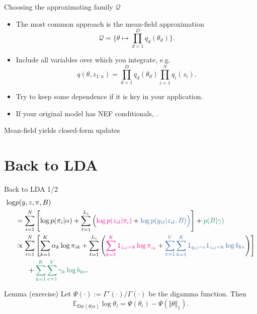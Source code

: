 \documentclass[10pt]{beamer}
\begin{document}
\begin{frame}{Choosing the approximating family $\mathcal Q$}
\begin{itemize}
  \item The most common approach is the mean-field approximation
  $$ \mathcal Q = \{\theta\mapsto \prod_{d=1}^D q_d(\theta_d)\}.$$
  \item Include all variables over which you integrate, e.g.
  \vfill
  \vfill
  $$
  q(\theta, z_{1:n}) = \prod_{d=1}^D q_d(\theta_d) \prod_{i=1}^N q_i(z_i).
  $$
\end{itemize}
\begin{itemize}
  \item Try to keep some dependence if it is key in your application.
  \item If your original model has NEF conditionals, .
\end{itemize}
\end{frame}

\begin{frame}{Mean-field yields closed-form updates}
\end{frame}

\section{Back to LDA}
\begin{frame}{Back to LDA 1/2}
  \footnotesize
\begin{align*}
  \log &p(y, z, \pi, B)\\
  &=\sum_{i=1}^N \left[\log p(\pi_i\vert \alpha) + \sum_{\ell=1}^{L_i} \Big(\un{\log p(z_{i\ell}\vert\pi_i)} + \unn{\log p(y_{i\ell}\vert z_{i\ell}, B)\Big)}\right] + \unnnn{p(B\vert \gamma)}\\
  &\propto \sum_{i=1}^N \left[\sum_{k=1}^K \alpha_k \log \pi_{ik} + \sum_{\ell=1}^{L_i} \left(\un{\sum_{k=1}^K 1_{z_{i\ell}=k}\log\pi_{_{ik}}} + \unn{\sum_{v=1}^V \sum_{k=1}^K 1_{y_{i\ell}=v}1_{z_{i\ell}=k} \log b_{kv}}\right)\right] \\
  &~~~~~+ \unnnn{\sum_{k=1}^K \sum_{v=1}^V \gamma_k\log b_{kv}}.
\end{align*}
\vfill
\begin{block}{Lemma (exercise)}
Let $\Psi(\cdot) := \Gamma'(\cdot)/\Gamma(\cdot)$ be the digamma function. Then
$$
\mathbb{E}_{\text{Dir}(\theta\vert\alpha)} \log \theta_i = \Psi(\theta_i) - \Psi(\Vert \theta\Vert_1).
$$
\end{block}
\vfill
\end{frame}
\end{document}
